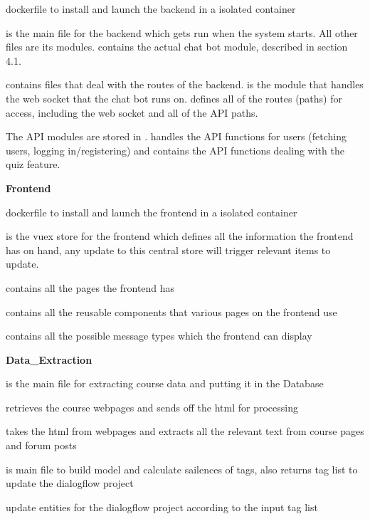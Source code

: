  dockerfile to install and launch the backend in a isolated container

 is the main file for the backend which gets run when the system starts. All other files are its modules.  contains the actual chat bot module, described in section 4.1.

 contains files that deal with the routes of the backend.  is the module that handles the web socket that the chat bot runs on.  defines all of the routes (paths) for access, including the web socket and all of the API paths.

The API modules are stored in .  handles the API functions for users (fetching users, logging in/registering) and  contains the API functions dealing with the quiz feature.

\textbf{Frontend}

 dockerfile to install and launch the frontend in a isolated container

 is the vuex store for the frontend which defines all the information the frontend has on hand, any update to this central store will trigger relevant items to update.

 contains all the pages the frontend has

 contains all the reusable components that various pages on the frontend use

 contains all the possible message types which the frontend can display

\textbf{Data\_Extraction}

 is the main file for extracting course data and putting it in the Database

 retrieves the course webpages and sends off the html for processing

 takes the html from webpages and extracts all the relevant text from course pages and forum posts

 is main file to build model and calculate sailences of tags, also returns tag list to update the dialogflow project 

 update entities for the dialogflow project according to the input tag list

